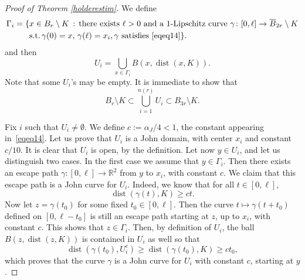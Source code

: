 \documentclass[12pt]{article}
\theoremstyle{definition}
\theoremstyle{remark}
\numberwithin{equation}{section}
\DeclareMathOperator{\dist}{dist}
\newcommand{\R}{\mathbb{R}}
\begin{document}
\begin{proof}[Proof of Theorem \ref{holderestim}]
    We define
    \begin{align}
        \Gamma_i=\{
    & x\in B_r\setminus K\,:\,\text{there exists $\ell > 0$ and a 1-Lipschitz curve }\gamma\colon[0,\ell]\rightarrow \overline{B}_{2r}\setminus K\\
    &\text{s.t.}\,\gamma(0)=x,\,\gamma(\ell)=x_i, \gamma\text{ satisfies }\eqref{eqeq14}\}.
    \end{align}
    and then  
    \begin{equation}
        U_i = \bigcup_{x\in \Gamma_i}B(x,\dist(x,K)). \label{defUi}
    \end{equation}
    Note that some $U_i$'s may be empty. It is immediate to show that
    \begin{equation}
        B_r\setminus K\subset\bigcup_{i=1}^{n(r)}U_i\subset B_{3r}\setminus K.
    \end{equation}

    Fix $i$ such that $U_i \ne \emptyset$.   We define $c := \alpha_J/4 < 1$, the constant appearing in \eqref{eqeq14}. Let us prove that $U_i$ is a John domain, with center $x_i$ and constant $c/10$. It is clear that $U_i$ is open, by the definition. Let now $y\in U_i$, and let us distinguish two cases. In the first case we assume that 
    $y \in \Gamma_i$. 
    Then there exists an escape path $\gamma:[0,\ell] \longrightarrow \R^2$ from $y$ to $x_i$, with constant $c$. We claim that this escape path is a John curve for $U_i$. Indeed, we know that for all $t\in [0,\ell]$,
    \[\dist(\gamma(t),K)\geq c  t.\]
    Now let $z=\gamma(t_0)$ for some fixed $t_0 \in [0,\ell]$. Then the curve $t \mapsto \gamma(t+t_0)$ defined on $[0,\ell - t_0]$ is still an escape path starting at $z$, up to $x_i$, with constant $c$. This shows that $z \in \Gamma_i$. Then, by definition of $U_i$, the ball $B(z,\dist(z,K))$ is contained in $U_i$ as well so that
    \[\dist(\gamma(t_0),U_i^c)\geq \dist(\gamma(t_0),K)\geq c  t_0,\]
    which proves that the curve $\gamma$ is a John curve for $U_i$ with constant $c$, starting at $y$. 



\end{proof}
\end{document}
